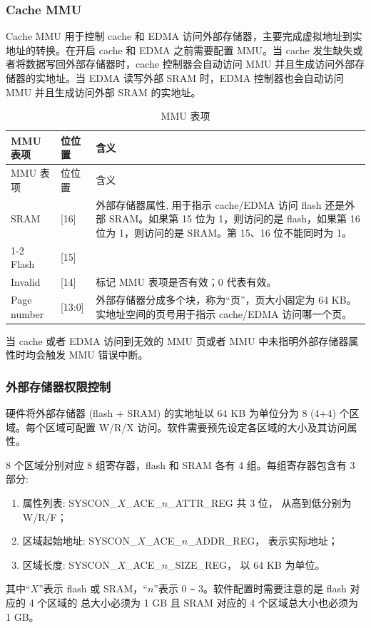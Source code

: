 \documentclass[main\_\_CN.tex]{subfiles}
\begin{document}
\subsubsection{Cache MMU}
Cache MMU 用于控制 cache 和 EDMA 访问外部存储器，主要完成虚拟地址到实地址的转换。在开启 cache 和 EDMA 之前需要配置 MMU。当 cache 发生缺失或者将数据写回外部存储器时，cache 控制器会自动访问 MMU 并且生成访问外部存储器的实地址。当 EDMA 读写外部 SRAM 时，EDMA 控制器也会自动访问 MMU 并且生成访问外部 SRAM 的实地址。
\newpage
\begin{longtable}[c]{|m{3cm}|m{2cm}|m{10cm}|}
    \caption{MMU 表项}
    \label{table:MMU Entries}
    \\\hline
    \rowcolor{lightgray}
    MMU 表项 & 位位置 & 含义 \\    \hline
    \endfirsthead
    \hline
    \rowcolor{lightgray}
    MMU 表项 & 位位置 & 含义 \\
    \endhead
    \endfoot
    \hline
    \endlastfoot
SRAM & [16] & 外部存储器属性, 用于指示 cache/EDMA 访问 flash 还是外部 SRAM。如果第 15 位为 1，则访问的是 flash，如果第 16 位为 1，则访问的是 SRAM。第 15、16 位不能同时为 1。\\\cline{1-2}
Flash    & [15] & \\\hline
Invalid    & [14] &	标记 MMU 表项是否有效；0 代表有效。\\\hline
Page number  &[13:0] & 外部存储器分成多个块，称为“页”，页大小固定为 64 KB。实地址空间的页号用于指示 cache/EDMA 访问哪一个页。 \\\hline
\end{longtable}

当	cache 或者 EDMA 访问到无效的 MMU 页或者 MMU 中未指明外部存储器属性时均会触发 MMU 错误中断。

\subsubsection{外部存储器权限控制}\label{External Memory Permission Controls}
硬件将外部存储器 (flash + SRAM) 的实地址以 64 KB 为单位分为 8 (4+4) 个区域。每个区域可配置 W/R/X 访问。软件需要预先设定各区域的大小及其访问属性。

8 个区域分别对应 8 组寄存器，flash 和 SRAM 各有 4 组。每组寄存器包含有 3 部分:
\begin{enumerate}
    \item 属性列表: SYSCON\_${X}$\_ACE\_${n}$\_ATTR\_REG 共 3 位， 从高到低分别为W/R/F；
    \item 区域起始地址: SYSCON\_${X}$\_ACE\_${n}$\_ADDR\_REG， 表示实际地址；
    \item 区域长度: SYSCON\_${X}$\_ACE\_${n}$\_SIZE\_REG， 以 64 KB 为单位。
\end{enumerate}
其中“${X}$”表示 flash 或 SRAM，“${n}$”表示 0 \verb+~+ 3。软件配置时需要注意的是 flash 对应的 4 个区域的 总大小必须为 1 GB 且 SRAM 对应的 4 个区域总大小也必须为 1 GB。
\end{document}
